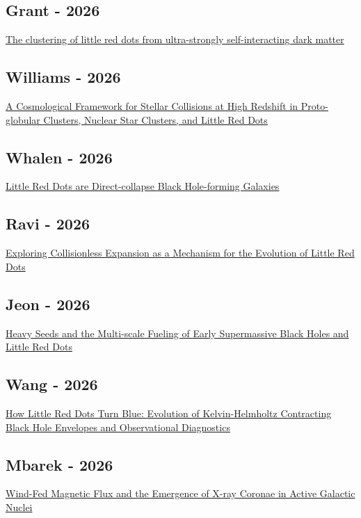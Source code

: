 \documentclass{article}
\begin{document}
\subsection*{Grant - 2026}
\href{https://ui.adsabs.harvard.edu/abs/2026MNRAS.552g1841R/abstract}{The clustering of little red dots from ultra-strongly self-interacting dark matter}

\subsection*{Williams - 2026}
\href{https://ui.adsabs.harvard.edu/abs/2026ApJ..1012....1W/abstract}{A Cosmological Framework for Stellar Collisions at High Redshift in Proto-globular Clusters, Nuclear Star Clusters, and Little Red Dots}

\subsection*{Whalen - 2026}
\href{https://ui.adsabs.harvard.edu/abs/2026ApJ..1011L..29W/abstract}{Little Red Dots are Direct-collapse Black Hole-forming Galaxies}

\subsection*{Ravi - 2026}
\href{https://ui.adsabs.harvard.edu/abs/2026ApJ..1011..120R/abstract}{Exploring Collisionless Expansion as a Mechanism for the Evolution of Little Red Dots}

\subsection*{Jeon - 2026}
\href{https://ui.adsabs.harvard.edu/abs/2026arXiv261036089J/abstract}{Heavy Seeds and the Multi-scale Fueling of Early Supermassive Black Holes and Little Red Dots}

\subsection*{Wang - 2026}
\href{https://ui.adsabs.harvard.edu/abs/2026arXiv261020709W/abstract}{How Little Red Dots Turn Blue: Evolution of Kelvin-Helmholtz Contracting Black Hole Envelopes and Observational Diagnostics}

\subsection*{Mbarek - 2026}
\href{https://ui.adsabs.harvard.edu/abs/2026arXiv261010681M/abstract}{Wind-Fed Magnetic Flux and the Emergence of X-ray Coronae in Active Galactic Nuclei}
\end{document}
